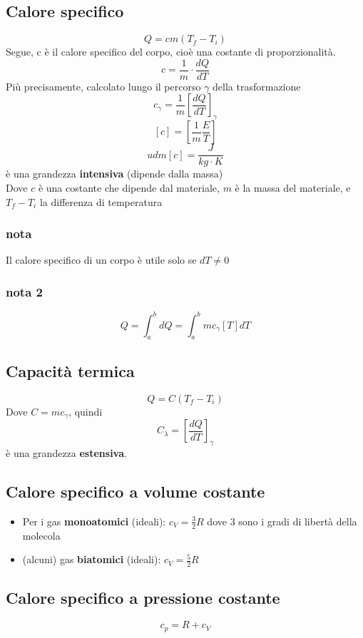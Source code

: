 \documentclass[a4paper]{report}
\begin{document}
  \subsection{Calore specifico}
  $$ Q = cm(T_f - T_i) $$
  Segue, c è il calore specifico del corpo, cioè una costante di proporzionalità.
  $$ c = \frac{1}{m} \cdot \frac{dQ}{dT} $$
  Più precisamente, calcolato lungo il percorso $\gamma$ della trasformazione
  $$ c_\gamma = \frac{1}{m} [\frac{dQ}{dT}]_\gamma $$
  $$ [c] = [\frac{1}{m} \frac{E}{T}]$$
  $$ udm[c] = \frac{J}{kg\cdot K} $$
  è una grandezza \textbf{intensiva} (dipende dalla massa)\\
  Dove $c$ è una costante che dipende dal materiale, $m$ è la massa del materiale, e $T_f - T_i$ la differenza di temperatura
  \subsubsection{nota}
  Il calore specifico di un corpo è utile solo se $dT \neq 0$
  \subsubsection{nota 2}
  $$ Q = \int_{a}^b dQ = \int_a^b m c_\gamma[T] dT $$
  \subsection{Capacità termica}
  $$ Q = C(T_f-T_i) $$
  Dove $C = mc_\gamma$, quindi
  $$ C_\lambda = [\frac{dQ}{dT}]_\gamma $$
  è una grandezza \textbf{estensiva}.
  \subsection{Calore specifico a volume costante}
  \begin{itemize}
    \item Per i gas \textbf{monoatomici} (ideali):  $c_V = \frac{3}{2}R$ dove $3$ sono i gradi di libertà della molecola
    \item (alcuni) gas \textbf{biatomici} (ideali):  $c_V = \frac{5}{2}R$
  \end{itemize}
  \subsection{Calore specifico a pressione costante}
  $$ c_p = R + c_V $$
\end{document}

